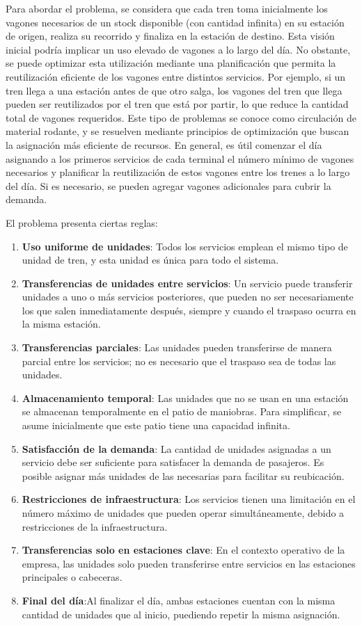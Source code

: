 \documentclass{article}
\begin{document}
    Para abordar el problema, se considera que cada tren toma inicialmente los vagones necesarios de un stock disponible (con cantidad infinita) en su estación de origen, realiza su recorrido y finaliza en la estación de destino. Esta visión inicial podría implicar un uso elevado de vagones a lo largo del día. No obstante, se puede optimizar esta utilización mediante una planificación que permita la reutilización eficiente de los vagones entre distintos servicios. Por ejemplo, si un tren llega a una estación antes de que otro salga, los vagones del tren que llega pueden ser reutilizados por el tren que está por partir, lo que reduce la cantidad total de vagones requeridos.
    Este tipo de problemas se conoce como circulación de material rodante, y se resuelven mediante principios de optimización que buscan la asignación más eficiente de recursos. En general, es útil comenzar el día asignando a los primeros servicios de cada terminal el número mínimo de vagones necesarios y planificar la reutilización de estos vagones entre los trenes a lo largo del día. Si es necesario, se pueden agregar vagones adicionales para cubrir la demanda.
    
    El problema presenta ciertas reglas:
    \begin{enumerate}
     \item \textbf{Uso uniforme de unidades}: Todos los servicios emplean el mismo tipo de unidad de tren, y esta unidad es única para todo el sistema.
    \item \textbf{Transferencias de unidades entre servicios}: Un servicio puede transferir unidades a uno o más servicios posteriores, que pueden no ser necesariamente los que salen inmediatamente después, siempre y cuando el traspaso ocurra en la misma estación.
    \item \textbf{Transferencias parciales}: Las unidades pueden transferirse de manera parcial entre los servicios; no es necesario que el traspaso sea de todas las unidades.
    \item \textbf{Almacenamiento temporal}: Las unidades que no se usan en una estación se almacenan temporalmente en el patio de maniobras. Para simplificar, se asume inicialmente que este patio tiene una capacidad infinita.
    \item \textbf{Satisfacción de la demanda}: La cantidad de unidades asignadas a un servicio debe ser suficiente para satisfacer la demanda de pasajeros. Es posible asignar más unidades de las necesarias para facilitar su reubicación.
    \item \textbf{Restricciones de infraestructura}: Los servicios tienen una limitación en el número máximo de unidades que pueden operar simultáneamente, debido a restricciones de la infraestructura.
    \item \textbf{Transferencias solo en estaciones clave}: En el contexto operativo de la empresa, las unidades solo pueden transferirse entre servicios en las estaciones principales o cabeceras.
    \item \textbf{Final del día}:Al finalizar el día, ambas estaciones cuentan con la misma cantidad de unidades que al inicio,
 puediendo repetir la misma asignación. 
    \end{enumerate}
\end{document}
